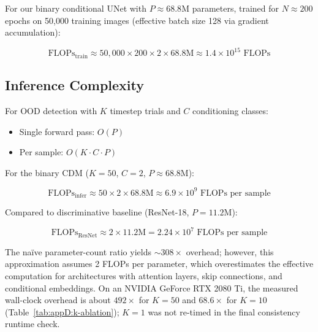 For our binary conditional UNet with $P \approx 68.8\text{M}$ parameters, trained for $N \approx 200$ epochs on 50{,}000 training images (effective batch size 128 via gradient accumulation):

\begin{equation}
\label{eq:appB:flops-train}
\text{FLOPs}_{\text{train}} \approx 50{,}000 \times 200 \times 2 \times 68.8\text{M} \approx 1.4 \times 10^{15} \text{ FLOPs}
\end{equation}

\subsection{Inference Complexity}
\label{app:math-derivations:complexity:inference}

For OOD detection with $K$ timestep trials and $C$ conditioning classes:
\begin{itemize}
  \item Single forward pass: $O(P)$
  \item Per sample: $O(K \cdot C \cdot P)$
\end{itemize}

For the binary CDM ($K = 50$, $C = 2$, $P \approx 68.8\text{M}$):

\begin{equation}
\label{eq:appB:flops-infer}
\text{FLOPs}_{\text{infer}} \approx 50 \times 2 \times 68.8\text{M} \approx 6.9 \times 10^{9} \text{ FLOPs per sample}
\end{equation}

Compared to discriminative baseline (ResNet-18, $P = 11.2\text{M}$):

\begin{equation}
\label{eq:appB:flops-resnet}
\text{FLOPs}_{\text{ResNet}} \approx 2 \times 11.2\text{M} = 2.24 \times 10^{7} \text{ FLOPs per sample}
\end{equation}

The na\"ive parameter-count ratio yields ${\sim}308\times$ overhead; however, this approximation assumes 2 FLOPs per parameter, which overestimates the effective computation for architectures with attention layers, skip connections, and conditional embeddings. On an NVIDIA GeForce RTX 2080 Ti, the measured wall-clock overhead is about $492\times$ for $K = 50$ and $68.6\times$ for $K = 10$ (Table~\ref{tab:appD:k-ablation}); $K = 1$ was not re-timed in the final consistency runtime check.
\endgroup
